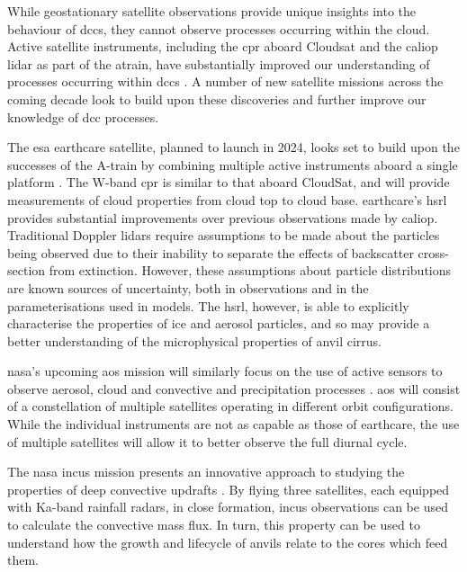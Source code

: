 While geostationary satellite observations provide unique insights into the behaviour of \acrshort{dcc}s, they cannot observe processes occurring within the cloud.
Active satellite instruments, including the \acrshort{cpr} aboard Cloudsat and the \acrlong{caliop} lidar as part of the \acrfull{atrain}, have substantially improved our understanding of processes occurring within \acrshort{dcc}s \citep{stephens_cloudsat_2018}.
A number of new satellite missions across the coming decade look to build upon these discoveries and further improve our knowledge of \acrshort{dcc} processes.

The \acrshort{esa} \acrfull{earthcare} satellite, planned to launch in 2024, looks set to build upon the successes of the A-train by combining multiple active instruments aboard a single platform \citep{wehr_earthcare_2023}.
The W-band \acrshort{cpr} is similar to that aboard CloudSat, and will provide measurements of cloud properties from cloud top to cloud base.
\acrshort{earthcare}'s \acrfull{hsrl} provides substantial improvements over previous observations made by \acrshort{caliop}.
Traditional Doppler lidars require assumptions to be made about the particles being observed due to their inability to separate the effects of backscatter cross-section from extinction.
However, these assumptions about particle distributions are known sources of uncertainty, both in observations and in the parameterisations used in models.
The \acrshort{hsrl}, however, is able to explicitly characterise the properties of ice and aerosol particles, and so may provide a better understanding of the microphysical properties of anvil cirrus.

\acrshort{nasa}'s upcoming \acrfull{aos} mission will similarly focus on the use of active sensors to observe aerosol, cloud and convective and precipitation processes \citep{braun_nasa_2023}.
\acrshort{aos} will consist of a constellation of multiple satellites operating in different orbit configurations.
While the individual instruments are not as capable as those of \acrshort{earthcare}, the use of multiple satellites will allow it to better observe the full diurnal cycle.

The \acrshort{nasa} \acrfull{incus} mission presents an innovative approach to studying the properties of deep convective updrafts \citep{vandenheever_tropical_2023}.
By flying three satellites, each equipped with Ka-band rainfall radars, in close formation, \acrshort{incus} observations can be used to calculate the convective mass flux.
In turn, this property can be used to understand how the growth and lifecycle of anvils relate to the cores which feed them.

